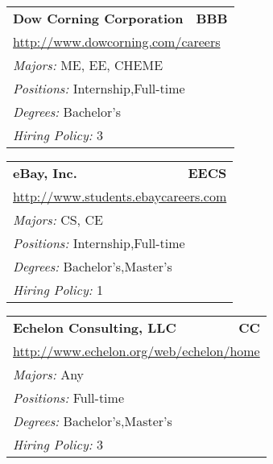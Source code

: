 \documentclass[twoside]{article}
\begin{document}
\begin{center}
\begin{multicols}{3}
\begin{FlushLeft}
\begin{minipage}{.9\columnwidth}
\end{minipage}
 
\begin{minipage}{.9\columnwidth}\begin{tabularx}{.95\columnwidth}{Xr}
                 {\Large\bf Dow Corning Corporation} & {\Large\bf BBB}\\
    \multicolumn{2}{p{.95\columnwidth}}{\url{http://www.dowcorning.com/careers}}\\
    \multicolumn{2}{p{.95\columnwidth}}{\emph{Majors:} ME, EE, CHEME}\\
    \multicolumn{2}{p{.95\columnwidth}}{\emph{Positions:} Internship,Full-time}\\
    \multicolumn{2}{p{.95\columnwidth}}{\emph{Degrees:} Bachelor's}\\
    \multicolumn{2}{p{.95\columnwidth}}{\emph{Hiring Policy:} 3}\\
    \end{tabularx}
    
\end{minipage}
 
\begin{minipage}{.9\columnwidth}\begin{tabularx}{.95\columnwidth}{Xr}
                 {\Large\bf eBay, Inc.} & {\Large\bf EECS}\\
    \multicolumn{2}{p{.95\columnwidth}}{\url{http://www.students.ebaycareers.com}}\\
    \multicolumn{2}{p{.95\columnwidth}}{\emph{Majors:} CS, CE}\\
    \multicolumn{2}{p{.95\columnwidth}}{\emph{Positions:} Internship,Full-time}\\
    \multicolumn{2}{p{.95\columnwidth}}{\emph{Degrees:} Bachelor's,Master's}\\
    \multicolumn{2}{p{.95\columnwidth}}{\emph{Hiring Policy:} 1}\\
    \end{tabularx}
    
\end{minipage}
 
\begin{minipage}{.9\columnwidth}\begin{tabularx}{.95\columnwidth}{Xr}
                 {\Large\bf Echelon Consulting, LLC} & {\Large\bf CC}\\
    \multicolumn{2}{p{.95\columnwidth}}{\url{http://www.echelon.org/web/echelon/home}}\\
    \multicolumn{2}{p{.95\columnwidth}}{\emph{Majors:} Any}\\
    \multicolumn{2}{p{.95\columnwidth}}{\emph{Positions:} Full-time}\\
    \multicolumn{2}{p{.95\columnwidth}}{\emph{Degrees:} Bachelor's,Master's}\\
    \multicolumn{2}{p{.95\columnwidth}}{\emph{Hiring Policy:} 3}\\
    \end{tabularx}
    

\end{minipage}
\end{FlushLeft}
\end{multicols}
\end{center}
\end{document}
